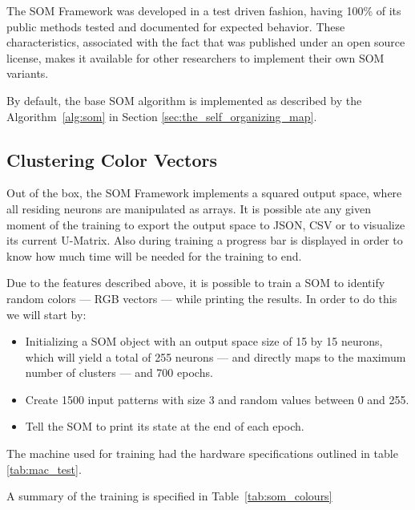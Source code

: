 The \ac{SOM} Framework was developed in a test driven fashion, having 100\% of its public methods tested and documented for expected behavior. These characteristics, associated with the fact that was published under an open source license, makes it available for other researchers to implement their own SOM variants.

By default, the base SOM algorithm is implemented as described by the Algorithm~\ref{alg:som} in Section \ref{sec:the_self_organizing_map}. 
\subsection{Clustering Color Vectors}
\label{sub:main_features}
Out of the box, the \ac{SOM} Framework implements a squared output space, where all residing neurons are manipulated as arrays. It is possible ate any given moment of the training to export the output space to \ac{JSON}, \ac{CSV} or to visualize its current \ac{U-Matrix}. Also during training a progress bar is displayed in order to know how much time will be needed for the training to end.

Due to the features described above, it is possible to train a \ac{SOM} to identify random colors --- RGB vectors --- while printing the results. In order to do this we will start by:
\begin{itemize}
  \item Initializing a SOM object with an output space size of 15 by 15 neurons, which will yield a total of 255 neurons --- and directly maps to the maximum number of clusters --- and 700 epochs.
  \item Create 1500 input patterns with size 3 and random values between 0 and 255. 
  \item Tell the SOM to print its state at the end of each epoch.
\end{itemize}
The machine used for training had the hardware specifications outlined in table \ref{tab:mac_test}.



A summary of the training is specified in Table~\ref{tab:som_colours}


